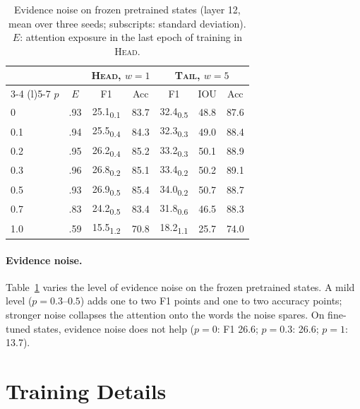 \documentclass[11pt]{article}
\newcommand{\HEAD}{\textup{\textsc{Head}}}
\newcommand{\TAIL}{\textup{\textsc{Tail}}}
\begin{document}
\begin{table}[h]
\centering
\small
\setlength{\tabcolsep}{3pt}
\begin{tabular}{@{}lcccccc@{}}
\toprule
& & \multicolumn{2}{c}{\HEAD, $w = 1$} & \multicolumn{3}{c}{\TAIL, $w = 5$} \\
\cmidrule(lr){3-4} \cmidrule(l){5-7}
$p$ & $E$ & F1 & Acc & F1 & IOU & Acc \\
\midrule
0 & .93 & 25.1\textsubscript{0.1} & 83.7 & 32.4\textsubscript{0.5} & 48.8 & 87.6 \\
0.1 & .94 & 25.5\textsubscript{0.4} & 84.3 & 32.3\textsubscript{0.3} & 49.0 & 88.4 \\
0.2 & .95 & 26.2\textsubscript{0.4} & 85.2 & 33.2\textsubscript{0.3} & 50.1 & 88.9 \\
0.3 & .96 & 26.8\textsubscript{0.2} & 85.1 & 33.4\textsubscript{0.2} & 50.2 & 89.1 \\
0.5 & .93 & 26.9\textsubscript{0.5} & 85.4 & 34.0\textsubscript{0.2} & 50.7 & 88.7 \\
0.7 & .83 & 24.2\textsubscript{0.5} & 83.4 & 31.8\textsubscript{0.6} & 46.5 & 88.3 \\
1.0 & .59 & 15.5\textsubscript{1.2} & 70.8 & 18.2\textsubscript{1.1} & 25.7 & 74.0 \\
\bottomrule
\end{tabular}
\caption{Evidence noise on frozen pretrained states (layer 12, mean over three seeds; subscripts: standard deviation). $E$: attention exposure in the last epoch of training in \HEAD.}
\label{tab:en-sweep}
\end{table}

\paragraph{Evidence noise.}
Table~\ref{tab:en-sweep} varies the level of evidence noise on the frozen pretrained states. A mild level ($p = 0.3$--$0.5$) adds one to two F1 points and one to two accuracy points; stronger noise collapses the attention onto the words the noise spares. On fine-tuned states, evidence noise does not help ($p = 0$: F1 26.6; $p = 0.3$: 26.6; $p = 1$: 13.7).

\section{Training Details}
\label{app:training}
\end{document}
